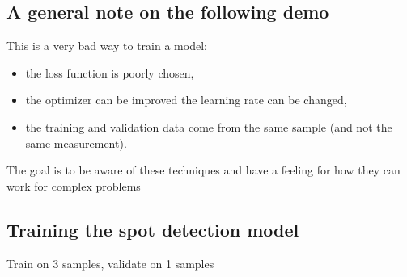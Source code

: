 \documentclass[letterpaper,10pt,english]{sphinxmanual}
\begin{document}
\subsection{A general note on the following demo}
\label{\detokenize{ML4NeutronImageSegmentation:a-general-note-on-the-following-demo}}
This is a very bad way to train a model;
\begin{itemize}
\item {} 
the loss function is poorly chosen,

\item {} 
the optimizer can be improved the learning rate can be changed,

\item {} 
the training and validation data  come from the same sample (and  not the same measurement).

\end{itemize}

The goal is to be aware of these techniques and have a feeling for how they can work for complex problems


\subsection{Training the spot detection model}
\label{\detokenize{ML4NeutronImageSegmentation:training-the-spot-detection-model}}
\begin{sphinxVerbatim}[commandchars=\\\{\}]
   
                           
                            
\end{sphinxVerbatim}

\begin{sphinxVerbatim}[commandchars=\\\{\}]
Train on 3 samples, validate on 1 samples
\end{sphinxVerbatim}
\end{document}
